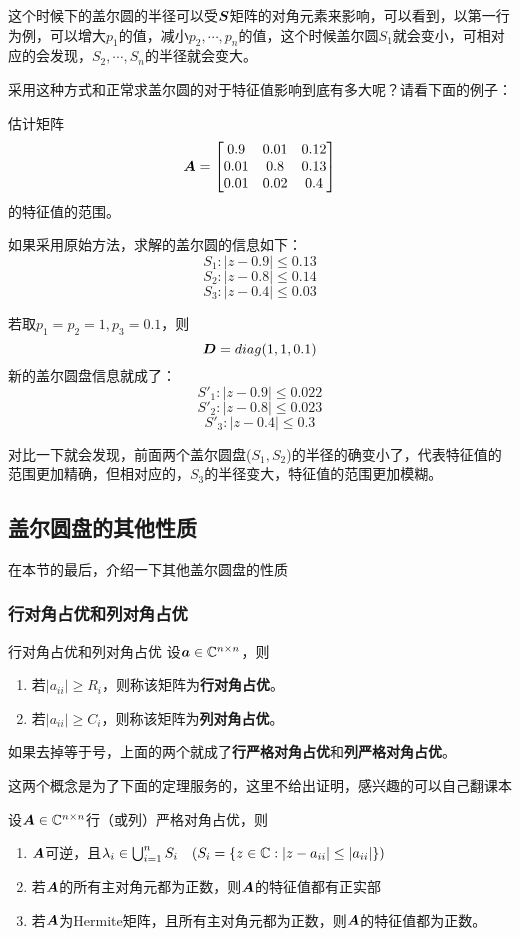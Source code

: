 \documentclass[12pt, a4paper, oneside, UTF8]{ctexbook}
\begin{document}
这个时候下的盖尔圆的半径可以受$\boldsymbol{S}$矩阵的对角元素来影响，可以看到，以第一行为例，可以增大$p_1$的值，减小$p_2,\cdots,p_n$的值，这个时候盖尔圆$S_1$就会变小，可相对应的会发现，$S_2,\cdots,S_n$的半径就会变大。

采用这种方式和正常求盖尔圆的对于特征值影响到底有多大呢？请看下面的例子：
\begin{example}
    估计矩阵\[\boldsymbol{A}=\begin{bmatrix}
        0.9&0.01&0.12\\
        0.01&0.8&0.13\\
        0.01&0.02&0.4
    \end{bmatrix}\]的特征值的范围。
\end{example}
\begin{solution}
    
    如果采用原始方法，求解的盖尔圆的信息如下：
    \[S_1:|z-0.9|\leq0.13\]
    \[S_2:|z-0.8|\leq0.14\]
    \[S_3:|z-0.4|\leq0.03\]

    若取$p_1=p_2=1, p_3=0.1$，则\[\boldsymbol{D}=diag(1,1,0.1)\]
    新的盖尔圆盘信息就成了：
    \[S'_1:|z-0.9|\leq 0.022\]
    \[S'_2:|z-0.8|\leq 0.023\]
    \[S'_3:|z-0.4|\leq 0.3\]

    对比一下就会发现，前面两个盖尔圆盘($S_1, S_2$)的半径的确变小了，代表特征值的范围更加精确，但相对应的，$S_3$的半径变大，特征值的范围更加模糊。
\end{solution}

\subsection{盖尔圆盘的其他性质}

在本节的最后，介绍一下其他盖尔圆盘的性质
\subsubsection{行对角占优和列对角占优}
\begin{defn}{行对角占优和列对角占优}{}
    设$\boldsymbol{a}\in\mathbb{C}^{n\times n}$，则\begin{enumerate}
        \item 若$|a_{ii}|\geq R_i$，则称该矩阵为\textbf{行对角占优}。
        \item 若$|a_{ii}|\geq C_i$，则称该矩阵为\textbf{列对角占优}。
    \end{enumerate}
    如果去掉等于号，上面的两个就成了\textbf{行严格对角占优}和\textbf{列严格对角占优}。
\end{defn}

这两个概念是为了下面的定理服务的，这里不给出证明，感兴趣的可以自己翻课本
\begin{them}{}{}
    设$\boldsymbol{A}\in\mathbb{C}^{n\times n}$行（或列）严格对角占优，则\begin{enumerate}
        \item $\boldsymbol{A}$可逆，且$\lambda_i\in\bigcup_{i=1}^{n}S_i\ \ \ (S_i=\{z\in\C:|z-a_{ii}|\leq |a_{ii}|\})$
        \item 若$\boldsymbol{A}$的所有主对角元都为正数，则$\boldsymbol{A}$的特征值都有正实部
        \item 若$\boldsymbol{A}$为Hermite矩阵，且所有主对角元都为正数，则$\boldsymbol{A}$的特征值都为正数。
    \end{enumerate}
\end{them}
\ifx\allfiles\undefined
\end{document}
